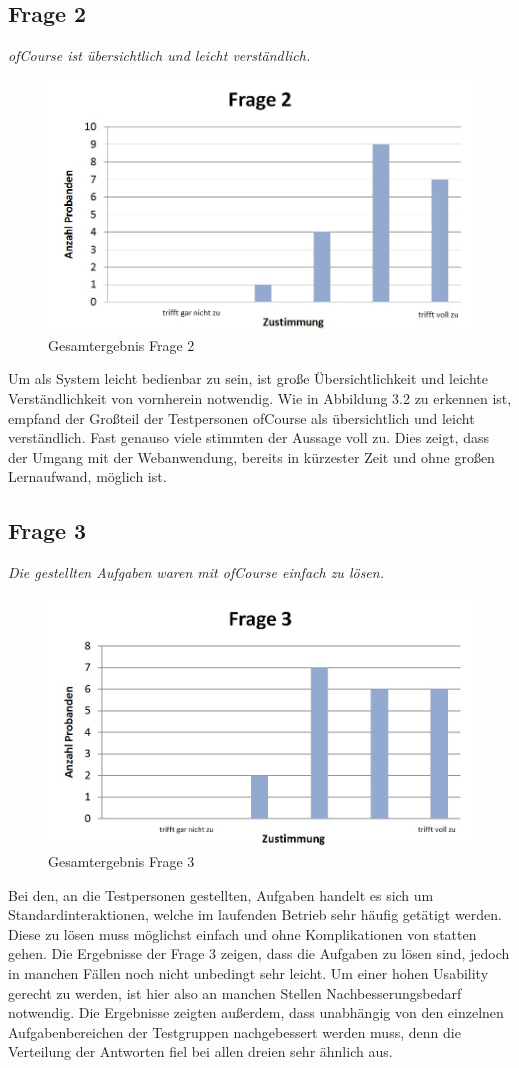 \subsection{Frage 2}
\begin{center}
	{\it ofCourse ist übersichtlich und leicht verständlich.}
\end{center}
\begin{figure}[h]
\centering
\includegraphics[width=0.7\linewidth]{img/Frage2}
\caption{Gesamtergebnis Frage 2}
\label{fig:Frage2}
\end{figure}
Um als System leicht bedienbar zu sein, ist große Übersichtlichkeit und leichte Verständlichkeit von vornherein notwendig. Wie in Abbildung 3.2 zu erkennen ist, empfand der Großteil der Testpersonen ofCourse als übersichtlich und leicht verständlich. Fast genauso viele stimmten der Aussage voll zu. Dies zeigt, dass der Umgang mit der Webanwendung, bereits in kürzester Zeit und ohne großen Lernaufwand, möglich ist.
\newpage
\subsection{Frage 3}
\begin{center}
	{\it Die gestellten Aufgaben waren mit ofCourse einfach zu lösen.}
\end{center}
\begin{figure}[h]
\centering
\includegraphics[width=0.7\linewidth]{img/Frage3}
\caption{Gesamtergebnis Frage 3}
\label{fig:Frage3}
\end{figure}
Bei den, an die Testpersonen gestellten, Aufgaben handelt es sich um Standardinteraktionen, welche im laufenden Betrieb sehr häufig getätigt werden. Diese zu lösen muss möglichst einfach und ohne Komplikationen von statten gehen. Die Ergebnisse der Frage 3 zeigen, dass die Aufgaben zu lösen sind, jedoch in manchen Fällen noch nicht unbedingt sehr leicht. Um einer hohen Usability gerecht zu werden, ist hier also an manchen Stellen Nachbesserungsbedarf notwendig. Die Ergebnisse zeigten außerdem, dass unabhängig von den einzelnen Aufgabenbereichen der Testgruppen nachgebessert werden muss, denn die Verteilung der Antworten fiel bei allen dreien sehr ähnlich aus.
\newpage
